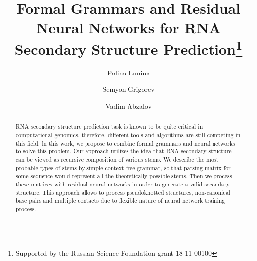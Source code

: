 \documentclass[runningheads]{llncs}
\begin{document}
%
\title{Formal Grammars and Residual Neural Networks for RNA Secondary Structure Prediction\thanks{Supported by the Russian Science Foundation grant 18-11-00100}}
%
%
\author{Polina Lunina \Letter \and
Semyon Grigorev \and
Vadim Abzalov}
%
%
%
\maketitle             %
%
\begin{abstract}
RNA secondary structure prediction task is known to be quite critical in computational genomics, therefore, different tools and algorithms are still competing in this field. In this work, we propose to combine formal grammars and neural networks to solve this problem. Our approach utilizes the idea that RNA secondary structure can be viewed as recursive composition of various stems. We describe the most probable types of stems by simple context-free grammar, so that parsing matrix for some sequence would represent all the theoretically possible stems. Then we process these matrices with residual neural networks in order to generate a valid secondary structure. This approach allows to process pseudoknotted structures, non-canonical base pairs and multiple contacts due to flexible nature of neural network training process.

\end{abstract}
%
%
%
\end{document}
